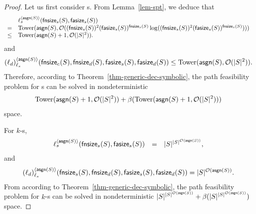 \begin{proof}
Let us first consider \SSPT{}s. From Lemma~\ref{lem-spt}, we deduce that 
{\small
$$
\begin{array}{l l}
& \ell_s^{\langle \mathsf{asgn}(S) \rangle}(\mathsf{fnsize}_s(S), \mathsf{fasize}_s(S)) \\
=& \mathrm{Tower}(\mathsf{asgn}(S), \mathcal{O}((\mathsf{fnsize}_s(S))^2 (\mathsf{fasize}_s(S))^{\mathsf{fnsize}_s(S)} \log ((\mathsf{fnsize}_s(S))^2 (\mathsf{fasize}_s(S))^{\mathsf{fnsize}_s(S)}) )) \\ 
\le &  \mathrm{Tower}(\mathsf{asgn}(S)+1, \mathcal{O}(|S|^2)).
\end{array}
$$
}
and
$$
(\ell_d)^{\langle \mathsf{asgn}(S) \rangle}_{\ell_s}(\mathsf{fnsize}_c(S), \mathsf{fnsize}_d(S), \mathsf{fasize}_s(S), \mathsf{fasize}_d(S)) \\
\le  \mathrm{Tower}(\mathsf{asgn}(S), \mathcal{O}(|S|^2)).
$$
Therefore, according to Theorem~\ref{thm-generic-dec-symbolic},  the path feasibility problem for \SSPT{}s can be solved in nondeterministic 
$$\mathrm{Tower}(\mathsf{asgn}(S)+1, \mathcal{O}(|S|^2)) + \beta(\mathrm{Tower}(\mathsf{asgn}(S)+1, \mathcal{O}(|S|^2)))$$
 space.
 
 For $k$-\RBSSPT{}s, 
 $$
\begin{array}{l c l}
\ell_s^{\langle \mathsf{asgn}(S) \rangle}(\mathsf{fnsize}_s(S), \mathsf{fasize}_s(S)) &=& |S|^{|S|^{\mathcal{O}(\mathsf{asgn}(S))}},
\end{array}
$$
and
$$
(\ell_d)^{\langle \mathsf{asgn}(S) \rangle}_{\ell_s}(\mathsf{fnsize}_s(S), \mathsf{fnsize}_d(S), \mathsf{fasize}_s(S), \mathsf{fasize}_d(S)) = |S|^{\mathcal{O}(\mathsf{asgn}(S))}.
$$
From according to Theorem~\ref{thm-generic-dec-symbolic}, the path feasibility problem for $k$-\RBSSPT{}s can be solved in nondeterministic 
$|S|^{|S|^{\mathcal{O}(\mathsf{asgn}(S))}} + \beta(|S|^{|S|^{\mathcal{O}(\mathsf{asgn}(S))}})$
space.
%
\end{proof}
